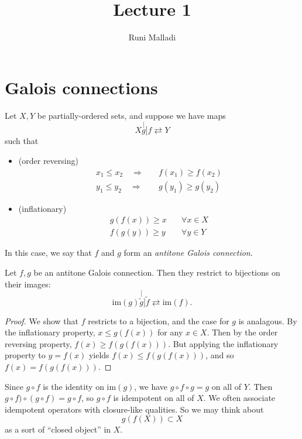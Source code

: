 \documentclass[12pt]{article}
\title{Lecture 1}
\author{Runi Malladi}
\begin{document}
\maketitle

\section{Galois connections} %

\begin{definition}
	Let $X,Y$ be partially-ordered sets, and suppose we have maps 
	\begin{equation*}
		X \stackrel[g]{f}{\rightleftarrows} Y
	\end{equation*}
	such that
	\begin{itemize}
		\item (order reversing)
			\begin{align*}
				x_1 \leq x_2 \quad \Rightarrow& \quad f(x_1) \geq f(x_2) \\
				y_1 \leq y_2 \quad \Rightarrow& \quad g(y_1) \geq g(y_2)
			\end{align*}
		\item (inflationary)
			\begin{align*}
				g(f(x)) \geq x \quad &\forall x\in X \\
				f(g(y)) \geq y \quad &\forall y\in Y
			\end{align*}
	\end{itemize}
	In this case, we say that $f$ and $g$ form an \emph{antitone Galois connection}.
\end{definition}

\begin{proposition}
\label{prop_antitone_Galois}
	Let $f,g$ be an antitone Galois connection. Then they restrict to bijections on their images:
	\begin{equation*}
		\text{im}(g) \stackrel[\tilde{g}]{\tilde{f}}{\rightleftarrows} \text{im}(f).
	\end{equation*}
\end{proposition}
\begin{proof}
	We show that $f$ restricts to a bijection, and the case for $g$ is analagous. By the inflationary property, $x\leq g(f(x))$ for any $x\in X$. Then by the order reversing property, $f(x) \geq f(g(f(x)))$. But applying the inflationary property to $y=f(x)$ yields $f(x) \leq f(g(f(x)))$, and so $f(x)=f(g(f(x)))$.
\end{proof}

\begin{remark}
	Since $g\circ f$ is the identity on $\text{im}(g)$, we have $g\circ f\circ g = g$ on all of $Y$. Then $g\circ f) \circ (g\circ f) = g\circ f$, so $g\circ f$ is idempotent on all of $X$. We often associate idempotent operators with closure-like qualities. So we may think about
	\begin{equation*}
		g(f(X)) \subset X
	\end{equation*}
	as a sort of ``closed object'' in $X$. 
\end{remark}
\end{document}

